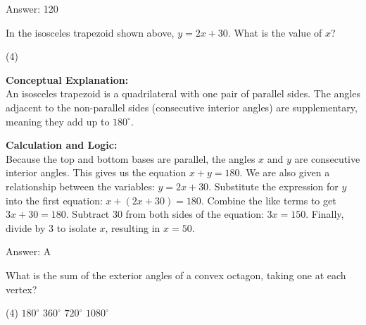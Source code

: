 \documentclass[11pt,paper=a4,answers]{exam}
\begin{document}
\begin{questions}
\begin{solution}
\vspace{30pt}

Answer: \colorbox{yellow!100}{120}
\end{solution}

\vspace{60pt}

\question
\begin{center}
\end{center}
In the isosceles trapezoid shown above, $y = 2x + 30$. What is the value of $x$?
\begin{tasks}(4)
\end{tasks}

\begin{solution}
\textbf{Conceptual Explanation:} \\
An isosceles trapezoid is a quadrilateral with one pair of parallel sides. The angles adjacent to the non-parallel sides (consecutive interior angles) are supplementary, meaning they add up to $180^\circ$.

\vspace{30pt}

\textbf{Calculation and Logic:} \\
Because the top and bottom bases are parallel, the angles $x$ and $y$ are consecutive interior angles. This gives us the equation $x + y = 180$. We are also given a relationship between the variables: $y = 2x + 30$. Substitute the expression for $y$ into the first equation: $x + (2x + 30) = 180$. Combine the like terms to get $3x + 30 = 180$. Subtract 30 from both sides of the equation: $3x = 150$. Finally, divide by 3 to isolate $x$, resulting in $x = 50$.

\vspace{30pt}

Answer: \colorbox{yellow!100}{A}
\end{solution}

\vspace{60pt}

\question
What is the sum of the exterior angles of a convex octagon, taking one at each vertex?
\begin{tasks}(4)
    \task $180^\circ$
    \task $360^\circ$
    \task $720^\circ$
    \task $1080^\circ$
\end{tasks}


\end{questions}
\end{document}
